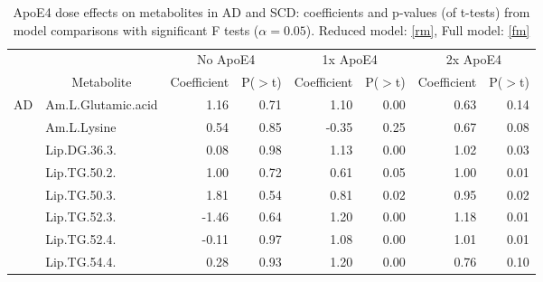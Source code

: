 \documentclass{amsart}
\begin{document}
\begin{table}
\caption{ApoE4 dose effects on metabolites in AD and SCD: coefficients and p-values (of t-tests) from model comparisons with significant F tests ($\alpha=0.05$). Reduced model: \eqref{rm}, Full model: \eqref{fm}}
\centering
\begin{tabular}{clrrrrrr} \toprule
\multicolumn{1}{l}{}  &                                & \multicolumn{2}{c}{No ApoE4}                               & \multicolumn{2}{c}{1x ApoE4}                               & \multicolumn{2}{c}{2x ApoE4}                                \\
\multicolumn{1}{l}{}  & \multicolumn{1}{c}{Metabolite} & \multicolumn{1}{c}{Coefficient} & \multicolumn{1}{c}{P($>$t)} & \multicolumn{1}{c}{Coefficient} & \multicolumn{1}{c}{P($>$t)} & \multicolumn{1}{c}{Coefficient} & \multicolumn{1}{c}{P($>$t)} \\ \midrule
\multirow{14}{0.056\linewidth}{\hspace{0pt}\Centering{}AD} & Am.L.Glutamic.acid & {\cellcolor[rgb]{0.749,0.855,0.675}}1.16 & 0.71 & {\cellcolor[rgb]{0.761,0.863,0.69}}1.10 & 0.00 & {\cellcolor[rgb]{0.863,0.922,0.824}}0.63 & 0.14 \\
 & Am.L.Lysine & {\cellcolor[rgb]{0.882,0.933,0.851}}0.54 & 0.85 & {\cellcolor[rgb]{0.992,0.973,0.973}}-0.35 & 0.25 & {\cellcolor[rgb]{0.855,0.918,0.816}}0.67 & 0.08 \\
 & Lip.DG.36.3. & {\cellcolor[rgb]{0.984,0.992,0.976}}0.08 & 0.98 & {\cellcolor[rgb]{0.757,0.859,0.682}}1.13 & 0.00 & {\cellcolor[rgb]{0.78,0.875,0.714}}1.02 & 0.03 \\
 & Lip.TG.50.2. & {\cellcolor[rgb]{0.784,0.875,0.722}}1.00 & 0.72 & {\cellcolor[rgb]{0.871,0.925,0.831}}0.61 & 0.05 & {\cellcolor[rgb]{0.784,0.878,0.722}}1.00 & 0.01 \\
 & Lip.TG.50.3. & {\cellcolor[rgb]{0.604,0.776,0.49}}1.81 & 0.54 & {\cellcolor[rgb]{0.824,0.902,0.773}}0.81 & 0.02 & {\cellcolor[rgb]{0.796,0.882,0.737}}0.95 & 0.02 \\
 & Lip.TG.52.3. & {\cellcolor[rgb]{0.965,0.898,0.898}}-1.46 & 0.64 & {\cellcolor[rgb]{0.741,0.851,0.663}}1.20 & 0.00 & {\cellcolor[rgb]{0.741,0.855,0.671}}1.18 & 0.01 \\
 & Lip.TG.52.4. & {\cellcolor[rgb]{0.996,0.992,0.992}}-0.11 & 0.97 & {\cellcolor[rgb]{0.765,0.867,0.698}}1.08 & 0.00 & {\cellcolor[rgb]{0.78,0.875,0.718}}1.01 & 0.01 \\
 & Lip.TG.54.4. & {\cellcolor[rgb]{0.941,0.965,0.922}}0.28 & 0.93 & {\cellcolor[rgb]{0.741,0.851,0.667}}1.20 & 0.00 & {\cellcolor[rgb]{0.835,0.906,0.788}}0.76 & 0.10 \\

\end{tabular}
\end{table}
\end{document}
